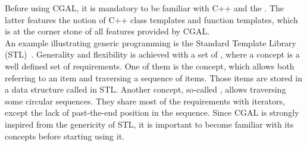 
Before using CGAL, it is mandatory to be familiar with C++ and the
. The latter features the notion
of C++ class templates and function templates, which is at the corner
stone of all features provided by CGAL.\\


An example illustrating generic programming is the Standard Template
Library (STL)~\cite{ms-stl-96}. Generality and flexibility is achieved
with a set of , where a concept is a well defined set
of requirements. One of them is the  concept, which
allows both referring to an item and traversing a sequence of
items. Those items are stored in a data structure called
 in STL. Another concept, so-called
, allows traversing some circular sequences. They
share most of the requirements with iterators, except the lack of
past-the-end position in the sequence. Since CGAL is strongly inspired
from the genericity of STL, it is important to become familiar with
its concepts before starting using it.


